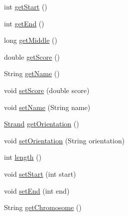 \begin{DoxyCompactItemize}
\item 
int \hyperlink{interfacebroad_1_1core_1_1annotation_1_1_lightweight_genomic_annotation_aa09c2220d181284077c5c020f2721b63}{get\+Start} ()
\item 
int \hyperlink{interfacebroad_1_1core_1_1annotation_1_1_lightweight_genomic_annotation_a68b4fd4cda3321ffd91dd427df9b24a7}{get\+End} ()
\item 
long \hyperlink{interfacebroad_1_1core_1_1annotation_1_1_lightweight_genomic_annotation_aa67e2c999b69ce3f322f88c4c8d67b3f}{get\+Middle} ()
\item 
double \hyperlink{interfacebroad_1_1core_1_1annotation_1_1_lightweight_genomic_annotation_a1331acfee9aa44b1987937f227be0885}{get\+Score} ()
\item 
String \hyperlink{interfacebroad_1_1core_1_1annotation_1_1_lightweight_genomic_annotation_af3d71fb0469ff283d3a4c4b539f58406}{get\+Name} ()
\item 
void \hyperlink{interfacebroad_1_1core_1_1annotation_1_1_lightweight_genomic_annotation_aff1d4a7789e8fee0258a91aaad66111d}{set\+Score} (double score)
\item 
void \hyperlink{interfacebroad_1_1core_1_1annotation_1_1_lightweight_genomic_annotation_a28cc1992e605bbd4b743e8cf6562fe01}{set\+Name} (String name)
\item 
\hyperlink{enumumms_1_1core_1_1annotation_1_1_annotation_1_1_strand}{Strand} \hyperlink{interfacebroad_1_1core_1_1annotation_1_1_lightweight_genomic_annotation_a1179b529806740f0a0302f8cd1c44b2d}{get\+Orientation} ()
\item 
void \hyperlink{interfacebroad_1_1core_1_1annotation_1_1_lightweight_genomic_annotation_a6bed3a14fbbcb700693200c4a634f69d}{set\+Orientation} (String orientation)
\item 
int \hyperlink{interfacebroad_1_1core_1_1annotation_1_1_lightweight_genomic_annotation_a25da9936b0e579e27596aa88f25d78cc}{length} ()
\item 
void \hyperlink{interfacebroad_1_1core_1_1annotation_1_1_lightweight_genomic_annotation_aa9663ad49b8a37f51e23928b94702d94}{set\+Start} (int start)
\item 
void \hyperlink{interfacebroad_1_1core_1_1annotation_1_1_lightweight_genomic_annotation_afa510429319c0efc147c5da446cab166}{set\+End} (int end)
\item 
String \hyperlink{interfacebroad_1_1core_1_1annotation_1_1_lightweight_genomic_annotation_a11b7345e12c3842e8b12530dfdf0e40c}{get\+Chromosome} ()

\end{DoxyCompactItemize}
